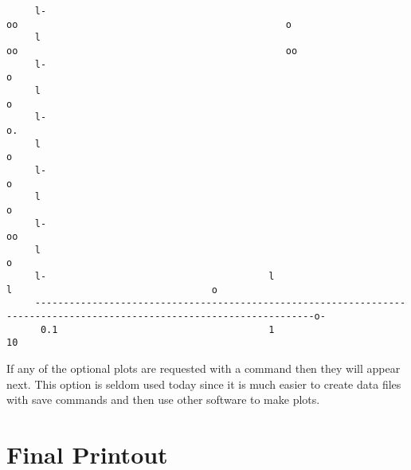 {\begin{verbatim}
     l-                                                                 oo                                               o
     l                                                                  oo                                               oo
     l-                                                                                                                   o
     l                                                                                                                    o
     l-                                                                                                                   o.
     l                                                                                                                     o
     l-                                                                                                                    o
     l                                                                                                                     o
     l-                                                                                                                    oo
     l                                                                                                                      o
     l-                                       l                                         l                                   o
     -----------------------------------------------------------------------------------------------------------------------o-
      0.1                                     1                                        10

\end{verbatim}
}

If any of the optional plots are requested with a 
command then they will appear next.
This option is seldom used today since it is much
easier to create data files with save commands and then use other
software to make plots.

\section{Final Printout}

